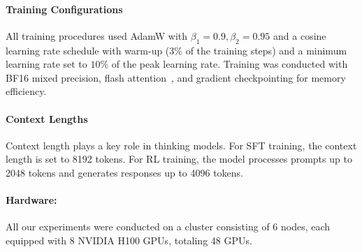 \paragraph{Training Configurations}
All training procedures used AdamW with $\beta_1=0.9,\beta_2=0.95$ and a cosine learning rate schedule with warm-up ($3\%$ of the training steps) and a minimum learning rate set to $10\%$ of the peak learning rate. Training was conducted with BF16 mixed precision, flash attention~\cite{dao2023flashattention2}, and gradient checkpointing for memory efficiency.



\paragraph{Context Lengths} Context length plays a key role in thinking models. For SFT training, the context length is set to 8192 tokens. For RL training, the model processes prompts up to 2048 tokens and generates responses up to 4096 tokens. 



\paragraph{Hardware:} All our experiments were conducted on a cluster consisting of 6 nodes, each equipped with 8 NVIDIA H100 GPUs, totaling 48 GPUs.





